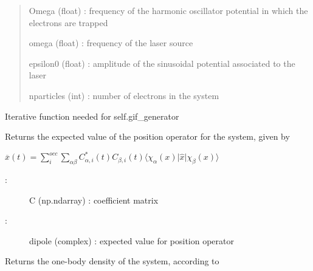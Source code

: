 \documentclass[letterpaper,10pt,english]{sphinxmanual}
\begin{document}
\begin{fulllineitems}
\begin{quote}
Omega (float) : frequency of the harmonic oscillator potential in which the electrons are trapped

omega (float) : frequency of the laser source

epsilon0 (float) : amplitude of the sinusoidal potential associated to the laser

nparticles (int) : number of electrons in the system
\end{quote}

\begin{fulllineitems}
\label{\detokenize{index:do.GHF.anima}}
Iterative function needed for self.gif\_generator

\end{fulllineitems}


\begin{fulllineitems}
\label{\detokenize{index:do.GHF.eval_dipole}}
Returns the expected value of the position operator for the system, given by

\(\overline{x}(t) = \sum_i^{occ} \sum_{\alpha\beta} C_{\alpha,i}^*(t) C_{\beta,i} (t) \langle \chi_{\alpha}(x) \vert \hat{x} \vert \chi_{\beta}(x)\rangle\)
\begin{description}
\item[{:}] \leavevmode
C (np.ndarray) : coefficient matrix

\item[{:            }] \leavevmode
dipole (complex) : expected value for position operator

\end{description}

\end{fulllineitems}


\begin{fulllineitems}
\label{\detokenize{index:do.GHF.eval_one_body_density}}
Returns the one-body density of the system, according to


\end{fulllineitems}
\end{fulllineitems}
\end{document}
